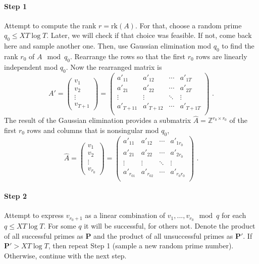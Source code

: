 \documentclass[paper=a4, fontsize=11pt]{scrartcl} %
\numberwithin{equation}{section} %
\numberwithin{figure}{section} %
\numberwithin{table}{section} %
\begin{document}
\paragraph{Step 1}Attempt to compute the rank $r = \mathrm{rk}(A)$. For that, choose a random prime $q_0\leq XT\log T$. Later, we will check if that choice was feasible. If not, come back here and sample another one. Then, use Gaussian elimination mod $q_0$ to find the rank $r_0$ of $A\mod q_0$. Rearrange the rows so that the first $r_0$ rows are linearly independent mod $q_0$. Now the rearranged matrix is
\begin{equation}
A' =
\begin{pmatrix}
v_1\\v_2\\\vdots\\v_{T\!+\!1}
\end{pmatrix}
=
\begin{pmatrix}
a'_{11} & a'_{12} & \cdots & a'_{1T} \\
a'_{21} & a'_{22} & \cdots & a'_{2T} \\
\vdots & \vdots & \ddots & \vdots \\
a'_{T\!+\!11} & a'_{T\!+\!12} & \cdots & a'_{T\!+\!1T} \\
\end{pmatrix}
\text{ .}
\end{equation}
The result of the Gaussian elimination provides a submatrix $\hat{A} = \mathbb{Z}^{r_0\times r_0}$ of the first $r_0$ rows and columns that is nonsingular mod $q_0$,
\begin{equation}
\hat{A} =
\begin{pmatrix}
v_1\\v_2\\\vdots\\v_{r_0}
\end{pmatrix}
=
\begin{pmatrix}
a'_{11} & a'_{12} & \cdots & a'_{1r_0} \\
a'_{21} & a'_{22} & \cdots & a'_{2r_0} \\
\vdots & \vdots & \ddots & \vdots \\
a'_{r_01} & a'_{r_02} & \cdots & a'_{r_0r_0} \\
\end{pmatrix}
\text{ .}
\end{equation}
\paragraph{Step 2} Attempt to express $v_{r_0+1}$ as a linear combination of $v_1,...,v_{r_0}\mod q$ for each $q\leq XT\log T$. For some $q$ it will be successful, for others not. Denote the product of all successful primes as $\boldsymbol{P}$ and the product of all unsuccessful primes as $\boldsymbol{P'}$. If $\boldsymbol{P'} > XT\log T$, then repeat Step 1 (sample a new random prime number). Otherwise, continue with the next step.
\end{document}
